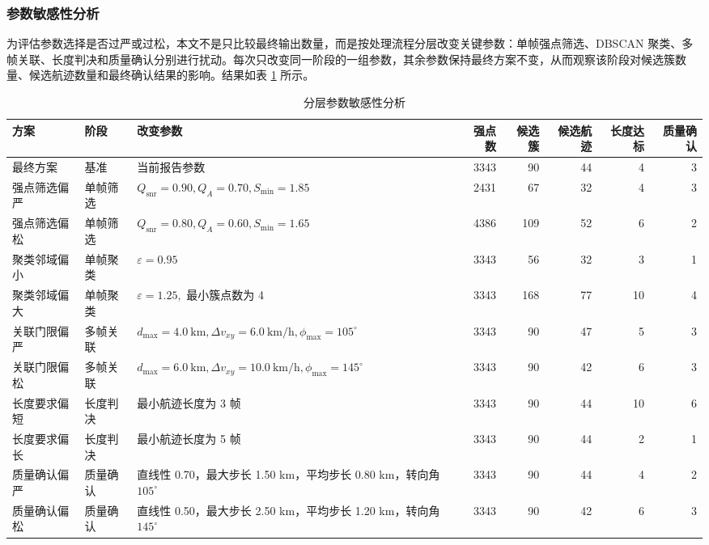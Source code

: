 \documentclass[UTF8,a4paper,12pt]{ctexart}
\numberwithin{figure}{section}
\numberwithin{table}{section}
\begin{document}
\subsubsection{参数敏感性分析}

为评估参数选择是否过严或过松，本文不是只比较最终输出数量，而是按处理流程分层改变关键参数：单帧强点筛选、DBSCAN 聚类、多帧关联、长度判决和质量确认分别进行扰动。每次只改变同一阶段的一组参数，其余参数保持最终方案不变，从而观察该阶段对候选簇数量、候选航迹数量和最终确认结果的影响。结果如表 \ref{tab:sensitivity} 所示。

\begin{table}[H]
  \centering
  \caption{分层参数敏感性分析}
  \label{tab:sensitivity}
  \scriptsize
  \setlength{\tabcolsep}{3pt}
  \begin{tabularx}{\textwidth}{llXrrrrr}
    \toprule
    方案 & 阶段 & 改变参数 & 强点数 & 候选簇 & 候选航迹 & 长度达标 & 质量确认 \\
    \midrule
    最终方案 & 基准 & 当前报告参数 & 3343 & 90 & 44 & 4 & 3 \\
    强点筛选偏严 & 单帧筛选 & \(Q_{\mathrm{snr}}=0.90,Q_A=0.70,S_{\min}=1.85\) & 2431 & 67 & 32 & 4 & 3 \\
    强点筛选偏松 & 单帧筛选 & \(Q_{\mathrm{snr}}=0.80,Q_A=0.60,S_{\min}=1.65\) & 4386 & 109 & 52 & 6 & 2 \\
    聚类邻域偏小 & 单帧聚类 & \(\varepsilon=0.95\) & 3343 & 56 & 32 & 3 & 1 \\
    聚类邻域偏大 & 单帧聚类 & \(\varepsilon=1.25,\) 最小簇点数为 4 & 3343 & 168 & 77 & 10 & 4 \\
    关联门限偏严 & 多帧关联 & \(d_{\max}=4.0\ \mathrm{km},\Delta v_{xy}=6.0\ \mathrm{km/h},\phi_{\max}=105^\circ\) & 3343 & 90 & 47 & 5 & 3 \\
    关联门限偏松 & 多帧关联 & \(d_{\max}=6.0\ \mathrm{km},\Delta v_{xy}=10.0\ \mathrm{km/h},\phi_{\max}=145^\circ\) & 3343 & 90 & 42 & 6 & 3 \\
    长度要求偏短 & 长度判决 & 最小航迹长度为 3 帧 & 3343 & 90 & 44 & 10 & 6 \\
    长度要求偏长 & 长度判决 & 最小航迹长度为 5 帧 & 3343 & 90 & 44 & 2 & 1 \\
    质量确认偏严 & 质量确认 & 直线性 0.70，最大步长 1.50 km，平均步长 0.80 km，转向角 \(105^\circ\) & 3343 & 90 & 44 & 4 & 2 \\
    质量确认偏松 & 质量确认 & 直线性 0.50，最大步长 2.50 km，平均步长 1.20 km，转向角 \(145^\circ\) & 3343 & 90 & 42 & 6 & 3 \\
    \bottomrule
  \end{tabularx}
\end{table}
\end{document}

